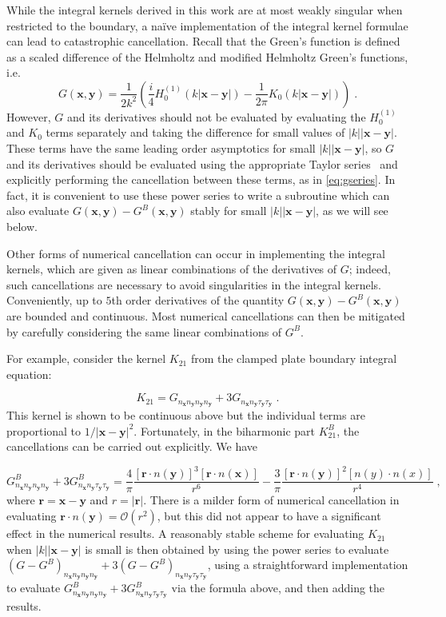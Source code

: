 \documentclass[preprint,12pt,3p]{elsarticle}
\newcommand{\bx}{{\mathbf{x}}}
\newcommand{\by}{{\mathbf{y}}}
\newcommand{\br}{{\mathbf{r}}}
\begin{document}
While the integral kernels derived in this work are at most weakly
singular when restricted to the boundary, a na\"{i}ve implementation
of the integral kernel formulae can lead to catastrophic cancellation. Recall that the Green's function is defined as a scaled difference of the Helmholtz
and modified Helmholtz Green's functions, i.e.
$$ G(\mathbf{x},\mathbf{y}) = \frac{1}{2k^2} \left ( \frac{i}{4} H_0^{(1)}(k|\bx -
\by |) - \frac{1}{2\pi} K_0(k|\bx - \by|) \right ) \; .$$
However, $G$ and its derivatives should not be evaluated by evaluating the
$H_0^{(1)}$ and $K_0$ terms separately and taking the difference for
small values of $|k||\bx - \by|$. These terms have the same leading
order asymptotics for small $|k||\bx - \by|$, so $G$ and its derivatives
should be evaluated using the appropriate Taylor series~\cite[\S 10.8]{NIST}
and explicitly performing the cancellation between these terms, as in
\eqref{eq:gseries}. In fact, it is convenient to use these power series
to write a subroutine which can also evaluate $G(\bx,\by) - G^B(\bx,\by)$
stably for small $|k||\bx-\by|$, as we will see below. 

Other forms of numerical cancellation can occur in implementing the
integral kernels, which are given as linear combinations of the derivatives
of $G$; indeed, such cancellations are necessary to avoid singularities
in the integral kernels. Conveniently, up to $5$th order derivatives of the
quantity $G(\bx,\by)-G^B(\bx,\by)$ are bounded and continuous. Most
numerical cancellations can then be mitigated by carefully considering the
same linear combinations of $G^B$.

For example, consider the kernel $K_{21}$ from the clamped plate boundary
integral equation:

$$  K_{21} = G_{n_\mathbf{x} n_\mathbf{y} n_\mathbf{y} n_\mathbf{y}} +
3G_{n_\mathbf{x} n_\mathbf{y} \tau_\mathbf{y} \tau_\mathbf{y}} \; .$$
This kernel is shown to be continuous above but the individual terms are
proportional to $1/|\bx-\by|^2$. Fortunately, in the biharmonic part $K_{21}^B$, the cancellations can be carried out explicitly. We have

$$ G^B_{n_\mathbf{x} n_\mathbf{y} n_\mathbf{y} n_\mathbf{y}} +
3G^B_{n_\mathbf{x} n_\mathbf{y} \tau_\mathbf{y} \tau_\mathbf{y}} =
\frac{4}{\pi} \frac{[\br \cdot n(\by)]^3 [\br \cdot n(\bx)]}{r^6}
- \frac{3}{\pi} \frac{[\br \cdot n(\by)]^2 [n(y)\cdot n(x)]}{r^4} \; ,$$
where $\br = \bx-\by$ and $r=|\br|$. There is a milder
form of numerical cancellation in evaluating $\br\cdot n(\by) =
\mathcal{O}(r^2)$, but this did not appear to have a significant effect
in the numerical results. A reasonably stable scheme for evaluating
$K_{21}$ when $|k||\bx-\by|$ is small is then obtained by
using the power series to evaluate $(G-G^B)_{n_\mathbf{x} n_\mathbf{y} n_\mathbf{y} n_\mathbf{y}}
+ 3(G-G^B)_{n_\mathbf{x} n_\mathbf{y} \tau_\mathbf{y} \tau_\mathbf{y}}$, using a
straightforward implementation to evaluate
$G^B_{n_\mathbf{x} n_\mathbf{y} n_\mathbf{y} n_\mathbf{y}} +
3G^B_{n_\mathbf{x} n_\mathbf{y} \tau_\mathbf{y} \tau_\mathbf{y}}$
via the formula above, and then adding the results.
\end{document}
